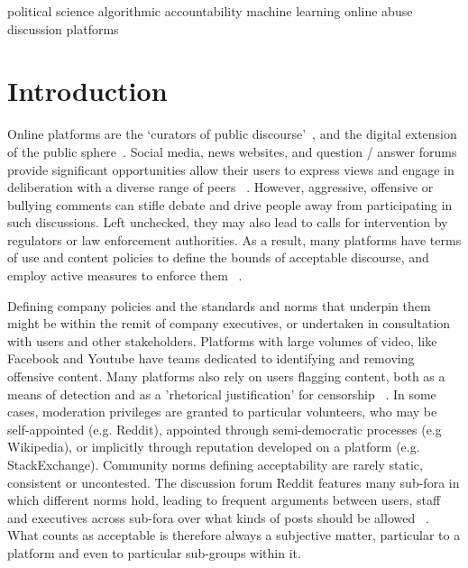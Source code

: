 \documentclass[runningheads,a4paper]{llncs}
\begin{document}
\begin{keywords}
political science
algorithmic accountability
machine learning
online abuse
discussion platforms
\end{keywords}

\section{Introduction}

Online platforms are the `curators of public discourse'~\cite{gillespie2010politics}, and the digital extension of the public sphere~\cite{dahlberg2001internet}. Social media, news websites, and question / answer forums provide significant opportunities allow their users to express views and engage in deliberation with a diverse range of peers ~\cite{halpern2013social}. However, aggressive, offensive or bullying comments can stifle debate and drive people away from participating in such discussions. Left unchecked, they may also lead to calls for intervention by regulators or law enforcement authorities. As a result, many platforms have terms of use and content policies to define the bounds of acceptable discourse, and employ active measures to enforce them ~\cite{ksiazek2015civil}.
 
Defining company policies and the standards and norms that underpin them might be within the remit of company executives, or undertaken in consultation with users and other stakeholders. Platforms with large volumes of video, like Facebook and Youtube have teams dedicated to identifying and removing offensive content. Many platforms also rely on users flagging content, both as a means of detection and as a 'rhetorical justification' for censorship ~\cite{crawford2016flag}. In some cases, moderation privileges are granted to particular volunteers, who may be self-appointed (e.g. Reddit), appointed through semi-democratic processes (e.g Wikipedia), or implicitly through reputation developed on a platform (e.g. StackExchange). Community norms defining acceptability are rarely static, consistent or uncontested. The discussion forum Reddit features many sub-fora in which different norms hold, leading to frequent arguments between users, staff and executives across sub-fora over what kinds of posts should be allowed ~\cite{centivany2016values}. What counts as acceptable is therefore always a subjective matter, particular to a platform and even to particular sub-groups within it.
\end{document}
